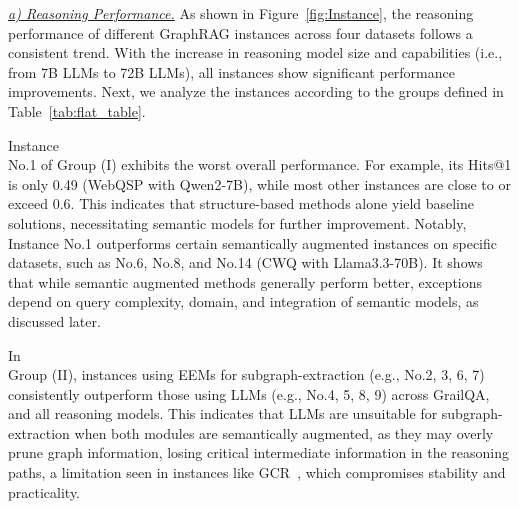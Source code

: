 {\it \underline{a) Reasoning Performance.}} 
As shown in Figure~\ref{fig:Instance}, the reasoning performance of different GraphRAG instances across four datasets follows a consistent trend. With the increase in reasoning model size and capabilities (i.e., from 7B LLMs to 72B LLMs), all instances show significant performance improvements. Next, we analyze the instances according to the groups defined in Table~\ref{tab:flat_table}.




Instance \\ No.1 of Group (I) exhibits the worst overall performance.
For example, its Hits@1 is only 0.49 (WebQSP with Qwen2-7B), while  most other instances are close to or exceed 0.6. 
This indicates that structure-based methods alone yield baseline solutions, necessitating semantic models for further improvement.
Notably, Instance No.1 outperforms certain semantically augmented instances on specific datasets, such as No.6, No.8, and No.14 (CWQ with Llama3.3-70B). It shows that while semantic augmented methods generally perform better, exceptions depend on query complexity, domain, and integration of semantic models, as discussed later.



In \\ Group (II), instances using EEMs for subgraph-extraction (e.g., No.2, 3, 6, 7) consistently outperform those using LLMs (e.g., No.4, 5, 8, 9) across GrailQA, and all reasoning models. 
This indicates that LLMs are unsuitable for subgraph-extraction when both modules are semantically augmented, as they may overly prune graph information, losing critical intermediate information in the reasoning paths, a limitation seen in instances like GCR~\cite{GCR}, which compromises stability and practicality.

